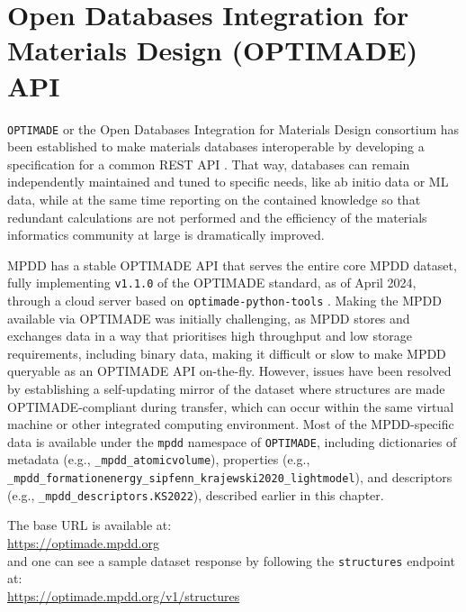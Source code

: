 \section{Open Databases Integration for Materials Design (OPTIMADE) API} \label{mpdd:sec:optimade}

\texttt{OPTIMADE} or the Open Databases Integration for Materials Design consortium has been established to make materials databases interoperable by developing a specification for a common REST API \cite{Evans2024DevelopmentsExchange}. That way, databases can remain independently maintained and tuned to specific needs, like ab initio data or ML data, while at the same time reporting on the contained knowledge so that redundant calculations are not performed and the efficiency of the materials informatics community at large is dramatically improved.

MPDD has a stable OPTIMADE API that serves the entire core MPDD dataset, fully implementing \texttt{v1.1.0} of the OPTIMADE standard, as of April 2024, through a cloud server based on \texttt{optimade-python-tools} \cite{Evans2021}.
Making the MPDD available via OPTIMADE was initially challenging, as MPDD stores and exchanges data in a way that prioritises high throughput and low storage requirements, including binary data, making it difficult or slow to make MPDD queryable as an OPTIMADE API on-the-fly.
However, issues have been resolved by establishing a self-updating mirror of the dataset where structures are made OPTIMADE-compliant during transfer, which can occur within the same virtual machine or other integrated computing environment. Most of the MPDD-specific data is available under the \texttt{mpdd} namespace of \texttt{OPTIMADE}, including dictionaries of metadata (e.g., \texttt{\_mpdd\_atomicvolume}), properties (e.g., \texttt{\_mpdd\_formationenergy\_sipfenn\_krajewski2020\_lightmodel}), and descriptors (e.g., \texttt{\_mpdd\_descriptors.KS2022}), described earlier in this chapter.

The base URL is available at:\\
\hspace{36pt} \href{https://optimade.mpdd.org}{https://optimade.mpdd.org}\\
and one can see a sample dataset response by following the \texttt{structures} endpoint at:\\
\hspace{36pt} \href{https://optimade.mpdd.org/v1/structures}{https://optimade.mpdd.org/v1/structures}\\



\printbibliography[heading=subbibintoc]
